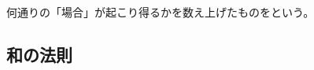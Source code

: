 \documentclass[../../imaging-math]{subfiles}
\begin{document}

何通りの「場合」が起こり得るかを数え上げたものをという。

\subsection{和の法則}
\end{document}
